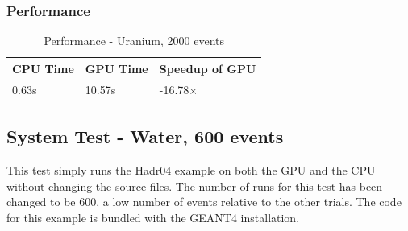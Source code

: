 \documentclass[12pt]{article}
\begin{document}
		\subsubsection{Performance}
		\begin{table}[H]
		\centering
		\caption{Performance - Uranium, 2000 events}\label{sys2Perf}
		\begin{tabular}{lll}
		\toprule
		CPU Time& GPU Time&Speedup of GPU\\\midrule
		0.63s&10.57s&-16.78$\times$\\\bottomrule
		\end{tabular}
		\end{table}

\subsection{System Test - Water, 600 events}
This test simply runs the Hadr04 example on both the GPU and the CPU without changing the source files. The number of runs for this test has been changed to be 600, a low number of events relative to the other trials. The code for this example is bundled with the GEANT4 installation.
\end{document}
